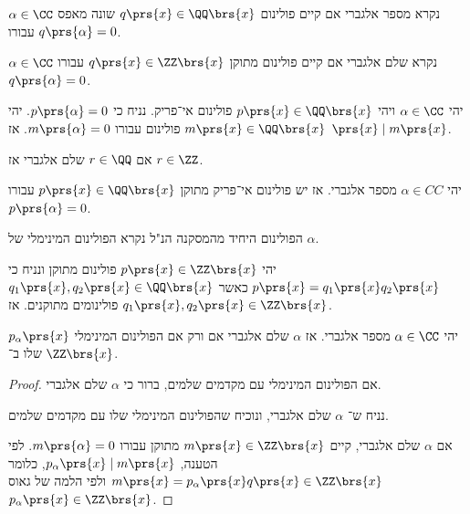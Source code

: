 \documentclass[a4paper,10pt,twoside,openany]{book}
\begin{document}
\begin{definition}
$\alpha \in \CC$
נקרא מספר אלגברי אם קיים פולינום
$q\prs{x} \in \QQ\brs{x}$
שונה מאפס עבורו
$q\prs{\alpha} = 0$.
\end{definition}
\begin{definition}
$\alpha \in \CC$
נקרא שלם אלגברי אם קיים פולינום מתוקן
$q\prs{x} \in \ZZ\brs{x}$
עבורו
$q \prs{\alpha} = 0$.
\end{definition}
\begin{proposition}
יהי
$\alpha \in \CC$
ויהי
$p\prs{x} \in \QQ\brs{x}$
פולינום אי־פריק.
נניח כי
$p\prs{\alpha} = 0$.
יהי
$m \prs{x} \in \QQ\brs{x}$
פולינום עבורו
$m\prs{\alpha} = 0$.
אז
$\prs{x} \mid m\prs{x}$.
\end{proposition}
\begin{proposition}
אם
$r \in \QQ$
שלם אלגברי אז
$r \in \ZZ$.
\end{proposition}
\begin{proposition}
יהי
$\alpha \in CC$
מספר אלגברי.
אז יש פולינום אי־פריק מתוקן
$p\prs{x} \in \QQ\brs{x}$
עבורו
$p\prs{\alpha} = 0$.
\end{proposition}
\begin{definition}
הפולינום היחיד מהמסקנה הנ"ל נקרא הפולינום המינימלי של
$\alpha$.
\end{definition}
\begin{lemma}[גאוס]
יהי
$p\prs{x} \in \ZZ\brs{x}$
פולינום מתוקן ונניח כי
$p\prs{x} = q_1\prs{x} q_2\prs{x}$
כאשר
$q_1\prs{x}, q_2\prs{x} \in \QQ\brs{x}$
פולינומים מתוקנים.
אז
$q_1\prs{x}, q_2\prs{x} \in \ZZ\brs{x}$.
\end{lemma}
\begin{proposition}
יהי
$\alpha \in \CC$
מספר אלגברי.
אז
$\alpha$
שלם אלגברי אם ורק אם הפולינום המינימלי
$p_{\alpha}\prs{x}$
שלו ב־%
$\ZZ\brs{x}$.
\end{proposition}

\begin{proof}
אם הפולינום המינימלי עם מקדמים שלמים, ברור כי
$\alpha$
שלם אלגברי.

נניח ש־%
$\alpha$
שלם אלגברי, ונוכיח שהפולינום המינימלי שלו עם מקדמים שלמים.

אם
$\alpha$
שלם אלגברי, קיים
$m\prs{x} \in \ZZ\brs{x}$
מתוקן עבורו
$m\prs{\alpha} = 0$.
לפי הטענה,
$p_{\alpha}\prs{x} \mid m\prs{x}$,
כלומר
$m\prs{x} = p_{\alpha}\prs{x} q\prs{x} \in \ZZ\brs{x}$
ולפי הלמה של גאוס
$p_{\alpha}\prs{x} \in \ZZ\brs{x}$.
\end{proof}
\end{document}

